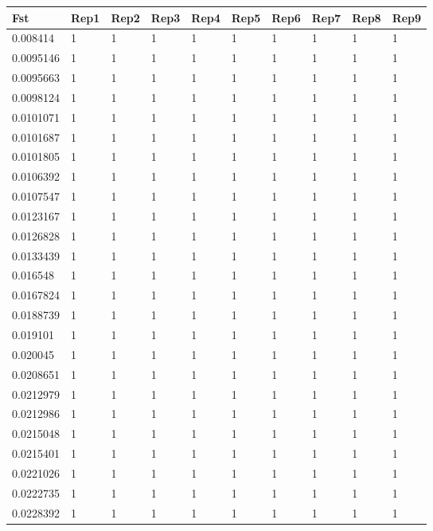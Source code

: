 \documentclass[varwidth=true, border={0, 15}]{standalone}
\begin{document}
\begin{table}[ht]
\centering
\begin{tabular}{llllllllll}
  \hline
Fst & Rep1 & Rep2 & Rep3 & Rep4 & Rep5 & Rep6 & Rep7 & Rep8 & Rep9 \\ 
  \hline
0.008414 & 1 & 1 & 1 & 1 & 1 & 1 & 1 & 1 & 1 \\ 
  0.0095146 & 1 & 1 & 1 & 1 & 1 & 1 & 1 & 1 & 1 \\ 
  0.0095663 & 1 & 1 & 1 & 1 & 1 & 1 & 1 & 1 & 1 \\ 
  0.0098124 & 1 & 1 & 1 & 1 & 1 & 1 & 1 & 1 & 1 \\ 
  0.0101071 & 1 & 1 & 1 & 1 & 1 & 1 & 1 & 1 & 1 \\ 
  0.0101687 & 1 & 1 & 1 & 1 & 1 & 1 & 1 & 1 & 1 \\ 
  0.0101805 & 1 & 1 & 1 & 1 & 1 & 1 & 1 & 1 & 1 \\ 
  0.0106392 & 1 & 1 & 1 & 1 & 1 & 1 & 1 & 1 & 1 \\ 
  0.0107547 & 1 & 1 & 1 & 1 & 1 & 1 & 1 & 1 & 1 \\ 
  0.0123167 & 1 & 1 & 1 & 1 & 1 & 1 & 1 & 1 & 1 \\ 
  0.0126828 & 1 & 1 & 1 & 1 & 1 & 1 & 1 & 1 & 1 \\ 
  0.0133439 & 1 & 1 & 1 & 1 & 1 & 1 & 1 & 1 & 1 \\ 
  0.016548 & 1 & 1 & 1 & 1 & 1 & 1 & 1 & 1 & 1 \\ 
  0.0167824 & 1 & 1 & 1 & 1 & 1 & 1 & 1 & 1 & 1 \\ 
  0.0188739 & 1 & 1 & 1 & 1 & 1 & 1 & 1 & 1 & 1 \\ 
  0.019101 & 1 & 1 & 1 & 1 & 1 & 1 & 1 & 1 & 1 \\ 
  0.020045 & 1 & 1 & 1 & 1 & 1 & 1 & 1 & 1 & 1 \\ 
  0.0208651 & 1 & 1 & 1 & 1 & 1 & 1 & 1 & 1 & 1 \\ 
  0.0212979 & 1 & 1 & 1 & 1 & 1 & 1 & 1 & 1 & 1 \\ 
  0.0212986 & 1 & 1 & 1 & 1 & 1 & 1 & 1 & 1 & 1 \\ 
  0.0215048 & 1 & 1 & 1 & 1 & 1 & 1 & 1 & 1 & 1 \\ 
  0.0215401 & 1 & 1 & 1 & 1 & 1 & 1 & 1 & 1 & 1 \\ 
  0.0221026 & 1 & 1 & 1 & 1 & 1 & 1 & 1 & 1 & 1 \\ 
  0.0222735 & 1 & 1 & 1 & 1 & 1 & 1 & 1 & 1 & 1 \\ 
  0.0228392 & 1 & 1 & 1 & 1 & 1 & 1 & 1 & 1 & 1 \\ 

\end{tabular}
\end{table}
\end{document}
